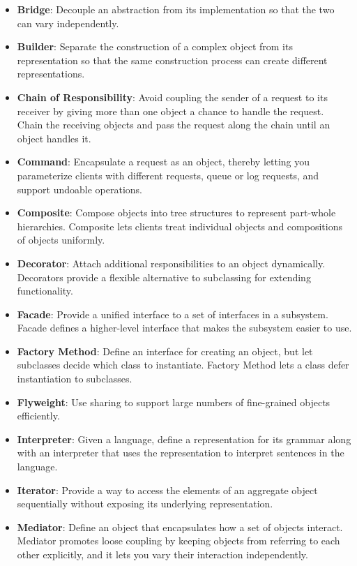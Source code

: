 \documentclass{report}
\begin{document}
\begin{itemize}
\begin{itemize}
                \item \textbf{Bridge}: Decouple an abstraction from its implementation so that the two can vary independently. 
                \item \textbf{Builder}: Separate the construction of a complex object from its representation so that the same construction process can create different representations. 
                \item \textbf{Chain of Responsibility}: Avoid coupling the sender of a request to its receiver by giving more than one object a chance to handle the request. Chain the receiving objects and pass the request along the chain until an object handles it.
                \item \textbf{Command}: Encapsulate a request as an object, thereby letting you parameterize clients with different requests, queue or log requests, and support undoable operations.  
                \item \textbf{Composite}: Compose objects into tree structures to represent part-whole hierarchies. Composite lets clients treat individual objects and compositions of objects uniformly. 
                \item \textbf{Decorator}: Attach additional responsibilities to an object dynamically. Decorators provide a flexible alternative to subclassing for extending functionality. 
                \item \textbf{Facade}: Provide a unified interface to a set of interfaces in a subsystem. Facade defines a higher-level interface that makes the subsystem easier to use.
                \item \textbf{Factory Method}: Define an interface for creating an object, but let subclasses decide which class to instantiate. Factory Method lets a class defer instantiation to subclasses. 
                \item \textbf{Flyweight}: Use sharing to support large numbers of fine-grained objects efficiently. 
                \item \textbf{Interpreter}: Given a language, define a representation for its grammar along with an interpreter that uses the representation to interpret sentences in the language. 
                \item \textbf{Iterator}: Provide a way to access the elements of an aggregate object sequentially without exposing its underlying representation. 
                \item \textbf{Mediator}: Define an object that encapsulates how a set of objects interact. Mediator promotes loose coupling by keeping objects from referring to each other explicitly, and it lets you vary their interaction independently. 

\end{itemize}
\end{itemize}
\end{document}
